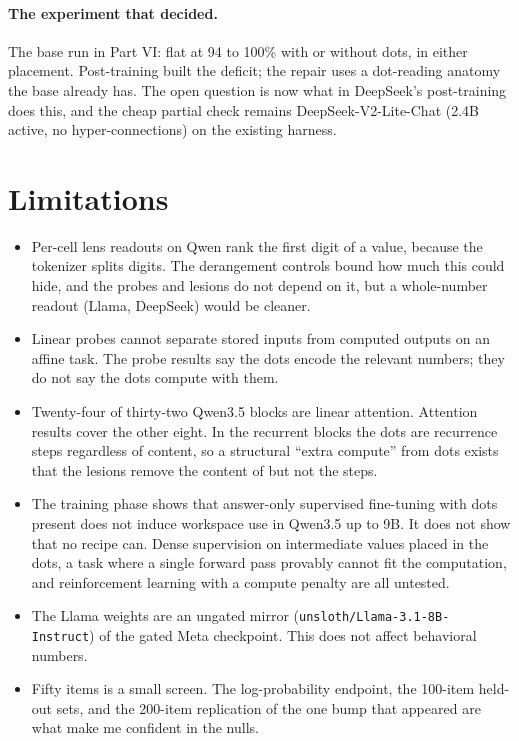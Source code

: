 \documentclass[11pt]{article}
\newcommand{\ttt}[1]{\texttt{\small #1}}
\begin{document}
\paragraph{The experiment that decided.} The base run in Part VI: flat at 94 to 100\% with or without dots, in either placement. Post-training built the deficit; the repair uses a dot-reading anatomy the base already has. The open question is now what in DeepSeek's post-training does this, and the cheap partial check remains DeepSeek-V2-Lite-Chat (2.4B active, no hyper-connections) on the existing harness.

\section{Limitations}

\begin{itemize}
\item Per-cell lens readouts on Qwen rank the first digit of a value, because the tokenizer splits digits. The derangement controls bound how much this could hide, and the probes and lesions do not depend on it, but a whole-number readout (Llama, DeepSeek) would be cleaner.
\item Linear probes cannot separate stored inputs from computed outputs on an affine task. The probe results say the dots encode the relevant numbers; they do not say the dots compute with them.
\item Twenty-four of thirty-two Qwen3.5 blocks are linear attention. Attention results cover the other eight. In the recurrent blocks the dots are recurrence steps regardless of content, so a structural ``extra compute'' from dots exists that the lesions remove the content of but not the steps.
\item The training phase shows that answer-only supervised fine-tuning with dots present does not induce workspace use in Qwen3.5 up to 9B. It does not show that no recipe can. Dense supervision on intermediate values placed in the dots, a task where a single forward pass provably cannot fit the computation, and reinforcement learning with a compute penalty are all untested.
\item The Llama weights are an ungated mirror (\ttt{unsloth/Llama-3.1-8B-Instruct}) of the gated Meta checkpoint. This does not affect behavioral numbers.
\item Fifty items is a small screen. The log-probability endpoint, the 100-item held-out sets, and the 200-item replication of the one bump that appeared are what make me confident in the nulls.
\end{itemize}
\end{document}
